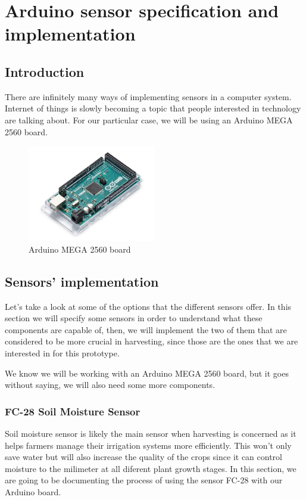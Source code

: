 \chapter{Arduino sensor specification and implementation}\label{cap:implementacion}

\section{Introduction}
There are infinitely many ways of implementing sensors in a computer system. Internet of things is slowly becoming a topic that people interested in technology are talking about. For our particular case, we will be using an Arduino MEGA 2560 board\cite{atmega}.

\begin{figure}[H]
    \centering
    \includegraphics[width=0.5\textwidth]{fig/mega2560.jpg}
    \caption{Arduino MEGA 2560 board}
    \label{fig:mega2560}
\end{figure}



\section{Sensors' implementation}
Let's take a look at some of the options that the different sensors offer. In this section we will specify some sensors in order to understand what these components are capable of, then, we will implement the two of them that are considered to be more crucial in harvesting, since those are the ones that we are interested in for this prototype. 

We know we will be working with an Arduino MEGA 2560 board, but it goes without saying, we will also need some more components. 

\subsection{FC-28 Soil Moisture Sensor}
Soil moisture sensor\cite{fc28} is likely the main sensor when harvesting is concerned as it helps farmers manage their irrigation systems more efficiently. This won't only save water but will also increase the quality of the crops since it can control moisture to the milimeter at all diferent plant growth stages. In this section, we are going to be documenting the process of using the sensor FC-28 with our Arduino board.

